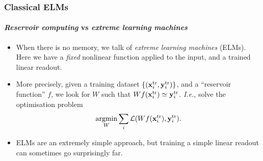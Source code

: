 \documentclass{beamer}
\begin{document}
\begin{frame}
\frametitle{Classical ELMs}
\framesubtitle{\textit{Reservoir computing} vs \textit{extreme learning machines}}
\begin{itemize}
    \item When there is no memory, we talk of \textit{extreme learning machines} (ELMs). Here we have a \textit{fixed} nonlinear function applied to the input, and a trained linear readout.
    \item More precisely, given a training dataset $\{(\mathbf x_i^{\rm tr},\mathbf y_i^{\rm tr})\}$, and a ``reservoir function'' $f$, we look for $W$ such that
    $%
        W f(\mathbf x_i^{\rm tr}) \simeq \mathbf y_i^{\rm tr}
    $. %
    \textit{I.e.}, solve the optimisation problem
    \begin{equation}
        \operatorname*{argmin}_W \sum_i \mathcal L(W f(\mathbf x_i^{\rm tr}), \mathbf y_i^{\rm tr}).
    \end{equation}
    \item ELMs are an extremely simple approach, but training a simple linear readout can sometimes go surprisingly far.
\end{itemize}
\end{frame}



\end{document}

